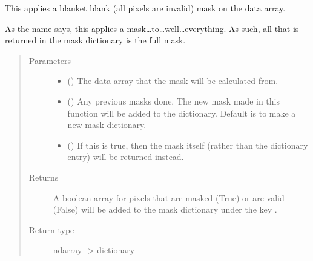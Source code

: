 \documentclass[letterpaper,10pt,english]{sphinxmanual}
\begin{document}

\begin{fulllineitems}
\label{\detokenize{python_docstrings/IfA_Smeargle.echo.masks.masks_echo300:IfA_Smeargle.echo.masks.masks_echo300.echo399_everything}}
This applies a blanket blank (all pixels are invalid) mask on the
data array.

As the name says, this applies a mask…to…well…everything. As such,
all that is returned in the mask dictionary is the full mask.
\begin{quote}\begin{description}
\item[{Parameters}] \leavevmode\begin{itemize}
\item {} 
 () \textendash{} The data array that the mask will be calculated from.

\item {} 
 (\sphinxstyleliteralemphasis{\sphinxupquote{ (}}\sphinxstyleliteralemphasis{\sphinxupquote{)}}) \textendash{} Any previous masks done. The new mask made in this function will be
added to the dictionary. Default is to make a new mask dictionary.

\item {} 
 (\sphinxstyleliteralemphasis{\sphinxupquote{ (}}\sphinxstyleliteralemphasis{\sphinxupquote{)}}) \textendash{} If this is true, then the mask itself (rather than the dictionary
entry) will be returned instead.

\end{itemize}

\item[{Returns}] \leavevmode
{} \textendash{} A boolean array for pixels that are masked (True) or are valid
(False) will be added to the mask dictionary under the
key .

\item[{Return type}] \leavevmode
ndarray -\textgreater{} dictionary

\end{description}\end{quote}

\end{fulllineitems}
\end{document}
